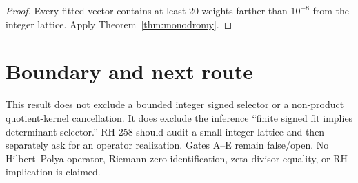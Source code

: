 \documentclass[11pt]{article}
\theoremstyle{remark}
\begin{document}
\begin{proof}
Every fitted vector contains at least 20 weights farther than $10^{-8}$ from
the integer lattice.  Apply Theorem~\ref{thm:monodromy}.
\end{proof}

\section{Boundary and next route}

This result does not exclude a bounded integer signed selector or a
non-product quotient-kernel cancellation.  It does exclude the inference
``finite signed fit implies determinant selector.''  RH-258 should audit a
small integer lattice and then separately ask for an operator realization.
Gates A--E remain false/open.  No Hilbert--Polya operator, Riemann-zero
identification, zeta-divisor equality, or RH implication is claimed.



\end{document}
